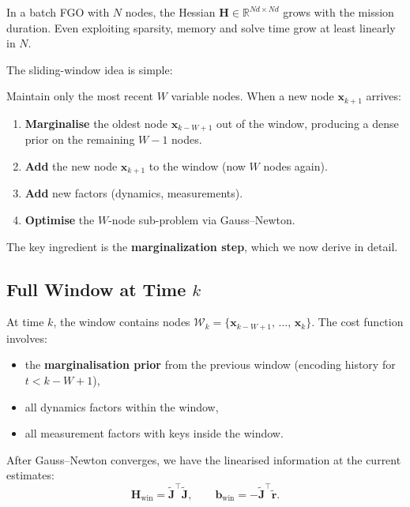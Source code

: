 \documentclass[11pt,a4paper]{article}
\newcommand{\bx}{\bm{x}}
\newcommand{\br}{\bm{r}}
\newcommand{\bb}{\bm{b}}
\newcommand{\bJ}{\bm{J}}
\newcommand{\bH}{\bm{H}}
\newcommand{\R}{\mathbb{R}}
\theoremstyle{definition}
\theoremstyle{plain}
\begin{document}
In a batch FGO with $N$ nodes, the Hessian $\bH \in \R^{Nd \times Nd}$
grows with the mission duration.  Even exploiting sparsity, memory and solve
time grow at least linearly in $N$.

The sliding-window idea is simple:

\begin{keybox}
  Maintain only the most recent $W$ variable nodes.
  When a new node $\bx_{k+1}$ arrives:
  \begin{enumerate}
    \item \textbf{Marginalise} the oldest node $\bx_{k-W+1}$ out of the
          window, producing a dense prior on the remaining $W-1$ nodes.
    \item \textbf{Add} the new node $\bx_{k+1}$ to the window (now
          $W$ nodes again).
    \item \textbf{Add} new factors (dynamics, measurements).
    \item \textbf{Optimise} the $W$-node sub-problem via Gauss--Newton.
  \end{enumerate}
\end{keybox}

The key ingredient is the \textbf{marginalization step}, which we now derive
in detail.

\subsection{Full Window at Time $k$}

At time $k$, the window contains nodes
$\mathcal{W}_k = \{\bx_{k-W+1},\, \ldots,\, \bx_k\}$.
The cost function involves:
\begin{itemize}
  \item the \textbf{marginalisation prior} from the previous window
        (encoding history for $t < k-W+1$),
  \item all dynamics factors within the window,
  \item all measurement factors with keys inside the window.
\end{itemize}

After Gauss--Newton converges, we have the linearised information at the
current estimates:
\begin{equation}
  \bH_{\text{win}} = \tilde{\bJ}^\top \tilde{\bJ}, \qquad
  \bb_{\text{win}} = -\tilde{\bJ}^\top \tilde{\br}.
  \label{eq:H_window}
\end{equation}

\end{document}
